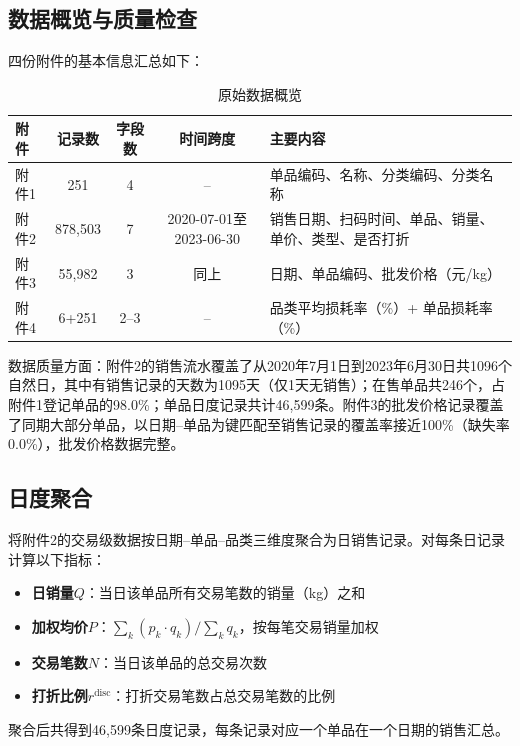\documentclass[12pt,a4paper]{ctexart}
\begin{document}
\subsection{数据概览与质量检查}

四份附件的基本信息汇总如下：

\begin{table}[H]
\centering
\caption{原始数据概览}
\begin{tabularx}{\textwidth}{lcccY}
\toprule
附件 & 记录数 & 字段数 & 时间跨度 & 主要内容 \\
\midrule
附件1 & 251 & 4 & -- & 单品编码、名称、分类编码、分类名称 \\
附件2 & 878,503 & 7 & 2020-07-01至2023-06-30 & 销售日期、扫码时间、单品、销量、单价、类型、是否打折 \\
附件3 & 55,982 & 3 & 同上 & 日期、单品编码、批发价格（元/kg） \\
附件4 & 6+251 & 2--3 & -- & 品类平均损耗率（\%）+ 单品损耗率（\%） \\
\bottomrule
\end{tabularx}
\end{table}

数据质量方面：附件2的销售流水覆盖了从2020年7月1日到2023年6月30日共1096个自然日，其中有销售记录的天数为1095天（仅1天无销售）；在售单品共246个，占附件1登记单品的98.0\%；单品日度记录共计46,599条。附件3的批发价格记录覆盖了同期大部分单品，以日期--单品为键匹配至销售记录的覆盖率接近100\%（缺失率0.0\%），批发价格数据完整。

\subsection{日度聚合}

将附件2的交易级数据按日期--单品--品类三维度聚合为日销售记录。对每条日记录计算以下指标：

\begin{itemize}
    \item \textbf{日销量}$Q$：当日该单品所有交易笔数的销量（kg）之和
    \item \textbf{加权均价}$P$：$\sum_k (p_k \cdot q_k) / \sum_k q_k$，按每笔交易销量加权
    \item \textbf{交易笔数}$N$：当日该单品的总交易次数
    \item \textbf{打折比例}$r^{\text{disc}}$：打折交易笔数占总交易笔数的比例
\end{itemize}

聚合后共得到46,599条日度记录，每条记录对应一个单品在一个日期的销售汇总。
\end{document}

